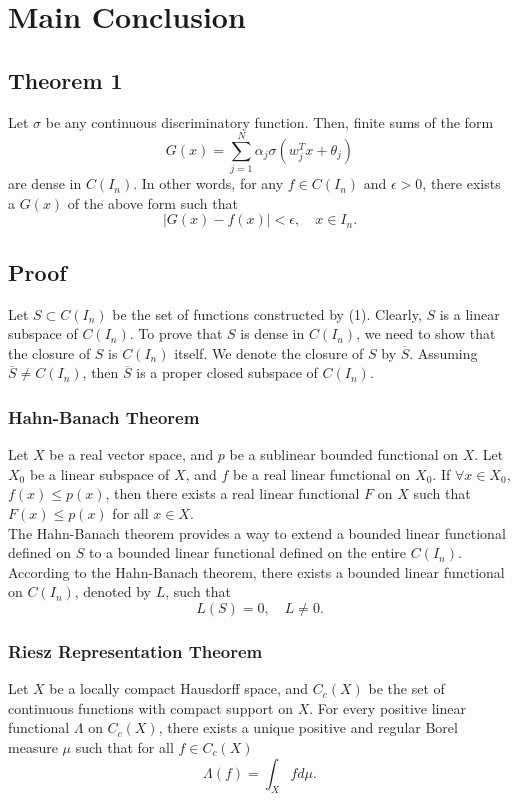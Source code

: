 \documentclass[11p,oneside]{book}
\begin{document}
\section*{Main Conclusion}

\subsection*{Theorem 1}
Let $\sigma$ be any continuous discriminatory function. Then, finite sums of the form
\[
G(x) = \sum_{j=1}^{N} \alpha_j \sigma(w_j^T x + \theta_j) \tag{1}
\]
are dense in $C(I_n)$. In other words, for any $f \in C(I_n)$ and $\epsilon > 0$, there exists a $G(x)$ of the above form such that
\[
|G(x) - f(x)| < \epsilon, \quad x \in I_n.
\]

\subsection*{Proof}
Let $S \subset C(I_n)$ be the set of functions constructed by (1). Clearly, $S$ is a linear subspace of $C(I_n)$. To prove that $S$ is dense in $C(I_n)$, we need to show that the closure of $S$ is $C(I_n)$ itself. We denote the closure of $S$ by $\overline{S}$. Assuming $\overline{S} \neq C(I_n)$, then $\overline{S}$ is a proper closed subspace of $C(I_n)$.

\subsubsection*{Hahn-Banach Theorem}
Let $X$ be a real vector space, and $p$ be a sublinear bounded functional on $X$. Let $X_0$ be a linear subspace of $X$, and $f$ be a real linear functional on $X_0$. If $\forall x \in X_0$, $f(x) \leq p(x)$, then there exists a real linear functional $F$ on $X$ such that $F(x) \leq p(x)$ for all $x \in X$.
\\

The Hahn-Banach theorem provides a way to extend a bounded linear functional defined on $S$ to a bounded linear functional defined on the entire $C(I_n)$. According to the Hahn-Banach theorem, there exists a bounded linear functional on $C(I_n)$, denoted by $L$, such that
\[
L(S) = 0, \quad L \neq 0.
\]

\subsubsection*{Riesz Representation Theorem}
Let $X$ be a locally compact Hausdorff space, and $C_c(X)$ be the set of continuous functions with compact support on $X$. For every positive linear functional $\Lambda$ on $C_c(X)$, there exists a unique positive and regular Borel measure $\mu$ such that for all $f \in C_c(X)$
\[
\Lambda(f) = \int_X f d\mu.
\]
\\
\end{document}
